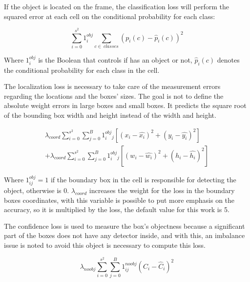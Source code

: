 If the object is located on the frame, the classification loss will perform the squared error at each cell on the conditional probability for each class: 

\begin{equation}
\label{eq:classification_loss}
    \sum_{i=0}^{s^2}1^{obj}_i \sum_{c\in~classes} \left ( p_i\left ( c \right )-\hat{p}_i\left ( c \right )\right )^2
\end{equation}

Where $1^{obj}_i$ is the Boolean that controls if has an object or not, $\hat{p}_i\left ( c \right )$ denotes the conditional probability for each class in the cell.

The localization loss is necessary to take care of the measurement errors regarding the locations and the boxes' sizes. The goal is not to define the absolute weight errors in large boxes and small boxes. It predicts the square root of the bounding box width and height instead of the width and height. 

\begin{equation}
\label{eq:localization_loss}
\begin{aligned}
    \lambda_{coord}\sum_{i=0}^{s^2}\sum_{j=0}^{B}1^{obj}_i_j\left [ \left ( x_i - \hat{x_i} \right )^2  + (y_i-\hat{y_i})^2 \right ] \\ 
    + \lambda_{coord}\sum_{i=0}^{s^2}\sum_{j=0}^{B}1^{obj}_i_j\left [ \left ( w_i - \hat{w_i} \right )^2  + (h_i-\hat{h_i})^2 \right ] 
    \end{aligned}
\end{equation}

Where $1_{ij}^{obj} = 1$ if the boundary box in the cell is responsible for detecting the object, otherwise is 0. $\lambda_{coord}$ increases the weight for the loss in the boundary boxes coordinates, with this variable is possible to put more emphasis on the accuracy, so it is multiplied by the loss, the default value for this work is 5. 

The confidence loss is used to measure the box's objectness because a significant part of the boxes does not have any detector inside, and with this, an imbalance issue is noted to avoid this object is necessary to compute this loss. 

\begin{equation}
    \label{eq:confidence_loss}
    \lambda_{noobj}\sum_{i=0}^{s^2}\sum_{j=0}^{B}1^{noobj}_{ij}\left ( C_i - \hat{C}_i \right )^2
\end{equation}


